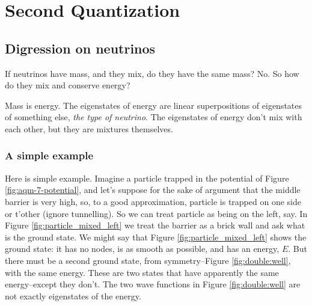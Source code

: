 \documentclass[]{article}
\begin{document}
\section {Second Quantization}

\subsection{Digression on neutrinos}

If neutrinos have mass, and they mix, do they have the same mass? No. So how do they mix and conserve energy?

Mass is energy. The eigenstates of energy are linear superpositions of eigenstates of something else, \emph{the type of neutrino}. The eigenstates of energy don't mix with each other, but they are mixtures themselves.

\subsubsection{A simple example}

Here is simple example. Imagine a particle trapped in the potential of Figure \ref{fig:aqm-7-potential}, and let's suppose for the sake of argument that the middle barrier is very high, so, to a good approximation, particle is trapped on one side or t'other (ignore tunnelling). So we can treat particle as being on the left, say. In Figure \ref{fig:particle_mixed_left} we treat the barrier as a brick wall and ask what is the ground state. We might say that Figure \ref{fig:particle_mixed_left} shows the ground state: it has no nodes, is as smooth as possible, and has an energy, $E$. But there must be a second ground state, from symmetry--Figure \ref{fig:double:well}, with the same energy. These are two states that have apparently the same energy--except they don't. The two wave functions in Figure  \ref{fig:double:well} are not exactly eigenstates of the energy.
\end{document}
